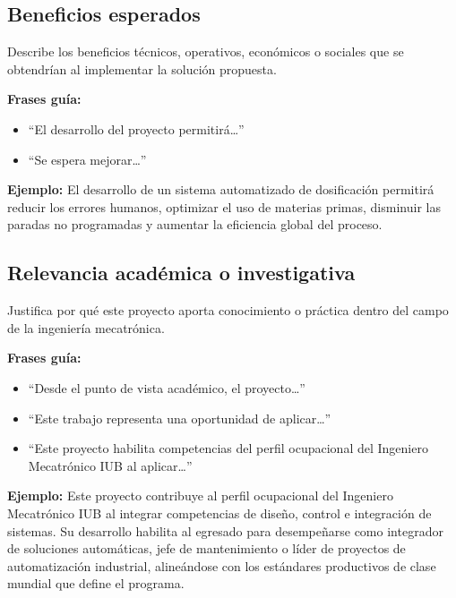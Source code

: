 \documentclass[12pt,letterpaper]{report}
\begin{document}
\subsection{Beneficios esperados}
\begin{instrucciones}
Describe los beneficios técnicos, operativos, económicos o sociales que se obtendrían al implementar la solución propuesta.

\vspace{2mm}
\noindent \textbf{Frases guía:}
\begin{itemize}
  \item ``El desarrollo del proyecto permitirá\ldots''
  \item ``Se espera mejorar\ldots''
\end{itemize}

\noindent \textbf{Ejemplo:} El desarrollo de un sistema automatizado de dosificación permitirá reducir los errores humanos, optimizar el uso de materias primas, disminuir las paradas no programadas y aumentar la eficiencia global del proceso.
\end{instrucciones}

\subsection{Relevancia académica o investigativa}
\begin{instrucciones}
Justifica por qué este proyecto aporta conocimiento o práctica dentro del campo de la ingeniería mecatrónica.

\vspace{2mm}
\noindent \textbf{Frases guía:}
\begin{itemize}
  \item ``Desde el punto de vista académico, el proyecto\ldots''
  \item ``Este trabajo representa una oportunidad de aplicar\ldots''
  \item ``Este proyecto habilita competencias del perfil ocupacional del Ingeniero Mecatrónico IUB al aplicar\ldots''
\end{itemize}

\noindent \textbf{Ejemplo:} Este proyecto contribuye al perfil ocupacional del Ingeniero Mecatrónico IUB al integrar competencias de diseño, control e integración de sistemas. Su desarrollo habilita al egresado para desempeñarse como integrador de soluciones automáticas, jefe de mantenimiento o líder de proyectos de automatización industrial, alineándose con los estándares productivos de clase mundial que define el programa.
\end{instrucciones}
\end{document}
